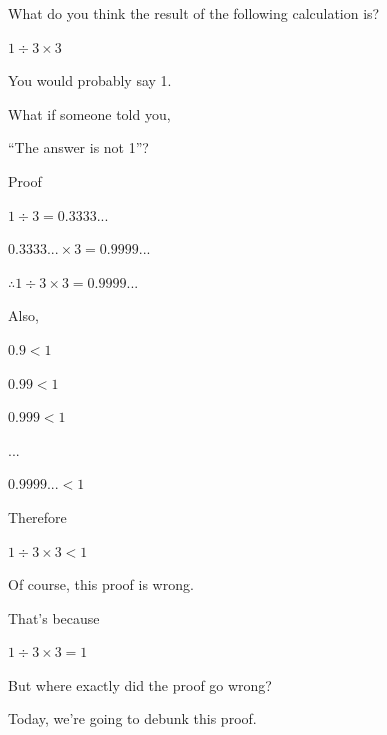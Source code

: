 %
%


\begin{frame}[c]{}{}
  What do you think the result of the following calculation is?

  \vspace{2ex}

  $1 \div 3 \times 3$

  \vspace{2ex}

  You would probably say 1.

  \vspace{2ex}

  What if someone told you,

  ``The answer is not 1''?
\end{frame}

\begin{frame}[c]{}{}
  {\large Proof}
\end{frame}

\begin{frame}[c]{}{}
  $1 \div 3 = 0.3333...$

  $0.3333... \times 3 = 0.9999...$

  \vspace{2ex}

  $\therefore 1 \div 3 \times 3 = 0.9999...$
\end{frame}

\begin{frame}[c]{}{}
  Also,

  \vspace{2ex}

  $0.9 < 1$

  $0.99 < 1$

  $0.999 < 1$
  
  ...

  $0.9999... < 1$
\end{frame}

\begin{frame}[c]{}{}
  Therefore

  \vspace{2ex}

  $1 \div 3 \times 3 < 1$
\end{frame}

\begin{frame}[c]{}{}
  Of course, this proof is wrong.

  \vspace{4ex}

  That's because

  $1 \div 3 \times 3 = 1$
\end{frame}

\begin{frame}[c]{}{}
  But where exactly did the proof go wrong?

  \vspace{4ex}

  Today, we're going to debunk this proof.
\end{frame}

